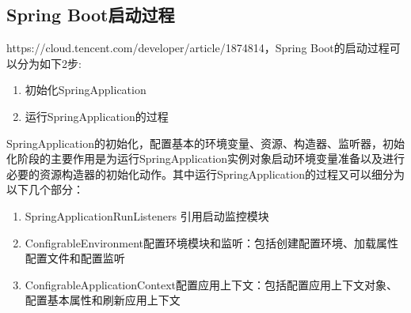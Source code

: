 \documentclass[../../../interview-questions.tex]{subfiles}
\begin{document}
\subsection{Spring Boot启动过程}

https://cloud.tencent.com/developer/article/1874814，Spring Boot的启动过程可以分为如下2步:

\begin{enumerate}
    \item {初始化SpringApplication}
    \item {运行SpringApplication的过程}
\end{enumerate}

SpringApplication的初始化，配置基本的环境变量、资源、构造器、监听器，初始化阶段的主要作用是为运行SpringApplication实例对象启动环境变量准备以及进行必要的资源构造器的初始化动作。其中运行SpringApplication的过程又可以细分为以下几个部分：

\begin{enumerate}
    \item {SpringApplicationRunListeners 引用启动监控模块}
    \item {ConfigrableEnvironment配置环境模块和监听：包括创建配置环境、加载属性配置文件和配置监听}
    \item {ConfigrableApplicationContext配置应用上下文：包括配置应用上下文对象、配置基本属性和刷新应用上下文}
\end{enumerate}
\end{document}
